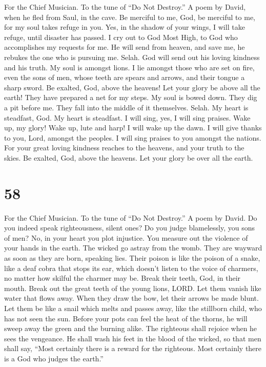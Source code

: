 For the Chief Musician. To the tune of ``Do Not Destroy.'' A poem by
David, when he fled from Saul, in the cave.  Be merciful
to me, God, be merciful to me, for my soul takes refuge in you. Yes, in
the shadow of your wings, I will take refuge, until disaster has passed.
 I cry out to God Most High, to God who accomplishes my
requests for me.  He will send from heaven, and save me,
he rebukes the one who is pursuing me. Selah. God will send out his
loving kindness and his truth.  My soul is amongst lions.
I lie amongst those who are set on fire, even the sons of men, whose
teeth are spears and arrows, and their tongue a sharp sword.
 Be exalted, God, above the heavens! Let your glory be
above all the earth!  They have prepared a net for my
steps. My soul is bowed down. They dig a pit before me. They fall into
the middle of it themselves. Selah.  My heart is
steadfast, God. My heart is steadfast. I will sing, yes, I will sing
praises.  Wake up, my glory! Wake up, lute and harp! I
will wake up the dawn.  I will give thanks to you, Lord,
amongst the peoples. I will sing praises to you amongst the nations.
 For your great loving kindness reaches to the heavens,
and your truth to the skies.  Be exalted, God, above the
heavens. Let your glory be over all the earth.

\hypertarget{section-57}{%
\section{58}\label{section-57}}

For the Chief Musician. To the tune of ``Do Not Destroy.'' A poem by
David.  Do you indeed speak righteousness, silent ones? Do
you judge blamelessly, you sons of men?  No, in your heart
you plot injustice. You measure out the violence of your hands in the
earth.  The wicked go astray from the womb. They are
wayward as soon as they are born, speaking lies.  Their
poison is like the poison of a snake, like a deaf cobra that stops its
ear,  which doesn't listen to the voice of charmers, no
matter how skilful the charmer may be.  Break their teeth,
God, in their mouth. Break out the great teeth of the young lions, LORD.
 Let them vanish like water that flows away. When they
draw the bow, let their arrows be made blunt.  Let them be
like a snail which melts and passes away, like the stillborn child, who
has not seen the sun.  Before your pots can feel the heat
of the thorns, he will sweep away the green and the burning alike.
 The righteous shall rejoice when he sees the vengeance.
He shall wash his feet in the blood of the wicked,  so
that men shall say, ``Most certainly there is a reward for the
righteous. Most certainly there is a God who judges the earth.''


